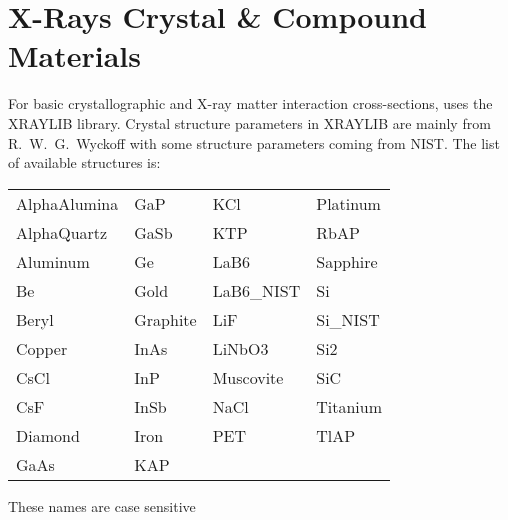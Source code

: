 \section{X-Rays Crystal \& Compound Materials}
\label{s:cryst.list}

For basic crystallographic and X-ray matter interaction cross-sections, \bmad uses the
XRAYLIB\cite{b:xraylib} library. Crystal structure parameters in XRAYLIB are mainly from
R.~W.~G.~Wyckoff\cite{b:wyckoff} with some structure parameters coming from NIST. The list of
available structures is:
\begin{center}
\begin{tabular}{llll} \toprule
AlphaAlumina & GaP       & KCl        & Platinum  \\
AlphaQuartz  & GaSb      & KTP        & RbAP      \\
Aluminum     & Ge        & LaB6       & Sapphire  \\
Be           & Gold      & LaB6_NIST  & Si        \\
Beryl        & Graphite  & LiF        & Si_NIST   \\
Copper       & InAs      & LiNbO3     & Si2       \\
CsCl         & InP       & Muscovite  & SiC       \\
CsF          & InSb      & NaCl       & Titanium  \\
Diamond      & Iron      & PET        & TlAP      \\
GaAs         & KAP       &            &           \\ \bottomrule
\end{tabular}
\end{center}
These names are case sensitive


